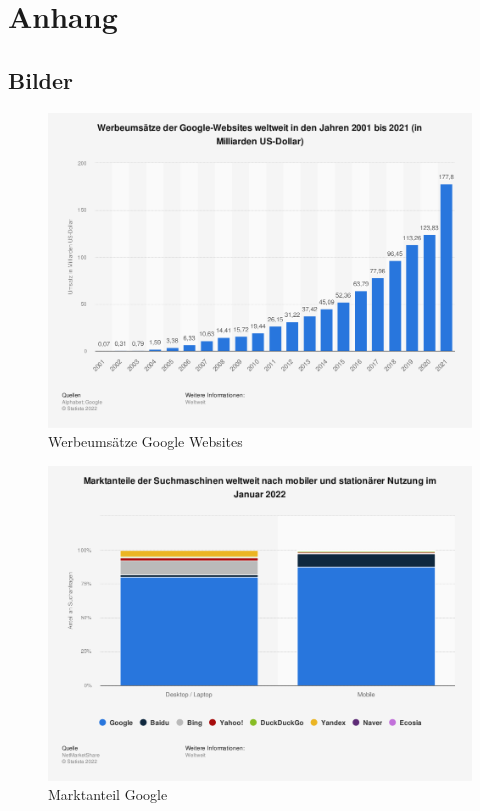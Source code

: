 \appendix

\renewcommand{\thechapter}{\Alph{chapter}}
\renewcommand{\thesection}{\Roman{section}}
\renewcommand{\thesubsection}{\Roman{section}}

\chapter{Anhang}
\label{appendix:annex}

\section{Bilder}
\begin{figure}
  \begin{centering}
    \includegraphics[width=.8\textwidth]{figures/appendix/werbeumsatz.png}
    \caption{Werbeumsätze Google Websites \cite{alphabet2022}}
    \label{fig:werbeumsatz}
  \end{centering}
\end{figure}

\begin{figure}
  \begin{centering}
    \includegraphics[width=.8\textwidth]{figures/appendix/marketshare.png}
    \caption{Marktanteil Google \cite{netmarketshare2022}}
    \label{fig:marketshare}
  \end{centering}
\end{figure}

